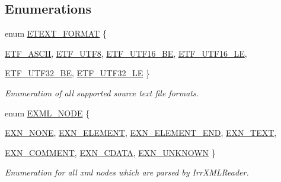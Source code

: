 \subsection*{Enumerations}
\begin{CompactItemize}
\item 
enum \hyperlink{namespaceirr_1_1io_c7e51e5a6bd00451dec248f497b16a9d}{ETEXT\_\-FORMAT} \{ \par
\hyperlink{namespaceirr_1_1io_c7e51e5a6bd00451dec248f497b16a9da83b76584091bdef7401e2e7c27837bf}{ETF\_\-ASCII}, 
\hyperlink{namespaceirr_1_1io_c7e51e5a6bd00451dec248f497b16a9de9766ce8a50bc70e144a7b0cc96ba8db}{ETF\_\-UTF8}, 
\hyperlink{namespaceirr_1_1io_c7e51e5a6bd00451dec248f497b16a9d5c0685f21f600ba0acdd84bae458ee5c}{ETF\_\-UTF16\_\-BE}, 
\hyperlink{namespaceirr_1_1io_c7e51e5a6bd00451dec248f497b16a9d331a03a8d3459ad9a05d31dee38a8a73}{ETF\_\-UTF16\_\-LE}, 
\par
\hyperlink{namespaceirr_1_1io_c7e51e5a6bd00451dec248f497b16a9da550dbb5ed61125ff6a12a9a50e4e7b1}{ETF\_\-UTF32\_\-BE}, 
\hyperlink{namespaceirr_1_1io_c7e51e5a6bd00451dec248f497b16a9d122cd8cec108b4e5a4040f1a9bcc6709}{ETF\_\-UTF32\_\-LE}
 \}
\begin{CompactList}\small\item\em Enumeration of all supported source text file formats. \item\end{CompactList}\item 
enum \hyperlink{namespaceirr_1_1io_86a02676c9cbb822e04d60c81b4f33ed}{EXML\_\-NODE} \{ \par
\hyperlink{namespaceirr_1_1io_86a02676c9cbb822e04d60c81b4f33eda7f8e643a481d9c8b75a25499f40235c}{EXN\_\-NONE}, 
\hyperlink{namespaceirr_1_1io_86a02676c9cbb822e04d60c81b4f33ed9df4f5baccc23a0ad1f6fa64d8de2fc0}{EXN\_\-ELEMENT}, 
\hyperlink{namespaceirr_1_1io_86a02676c9cbb822e04d60c81b4f33ed54ef1997279f08180634f4a897f771b8}{EXN\_\-ELEMENT\_\-END}, 
\hyperlink{namespaceirr_1_1io_86a02676c9cbb822e04d60c81b4f33ed0edf973f8ca0f6097f69369539d432a4}{EXN\_\-TEXT}, 
\par
\hyperlink{namespaceirr_1_1io_86a02676c9cbb822e04d60c81b4f33eddc47ef6b25afabf76ff3acea8fea2680}{EXN\_\-COMMENT}, 
\hyperlink{namespaceirr_1_1io_86a02676c9cbb822e04d60c81b4f33edabb26cfe097fadf64c45db0f76523ac6}{EXN\_\-CDATA}, 
\hyperlink{namespaceirr_1_1io_86a02676c9cbb822e04d60c81b4f33edf80bf58165975de0e7a7c28882906865}{EXN\_\-UNKNOWN}
 \}
\begin{CompactList}\small\item\em Enumeration for all xml nodes which are parsed by IrrXMLReader. \item\end{CompactList}\end{CompactItemize}
